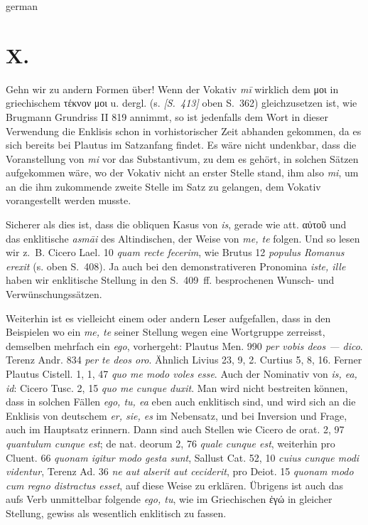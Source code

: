 \begin{otherlanguage*}{german}
\section*{X.}

Gehn wir zu andern Formen über! Wenn der Vokativ \emph{mī} wirklich dem μοι in griechischem τέκνον μοι u. dergl. (s. \hypertarget{p413}{\emph{[S.~413]}}\label{p413} oben S.~362) gleichzusetzen ist, wie Brugmann Grundriss II 819 annimmt, so ist jedenfalls dem Wort in dieser Verwendung die Enklisis schon in vorhistorischer Zeit abhanden gekommen, da es sich bereits bei Plautus im Satzanfang findet. Es wäre nicht undenkbar, dass die Voranstellung von \emph{mi} vor das Substantivum, zu dem es gehört, in solchen Sätzen aufgekommen wäre, wo der Vokativ nicht an erster Stelle stand, ihm also \emph{mi}, um an die ihm zukommende zweite Stelle im Satz zu gelangen, dem Vokativ vorangestellt werden musste.

Sicherer als dies ist, dass die obliquen Kasus von \emph{is}, gerade wie att. αὐτοῦ und das enklitische \emph{asmāi} des Altindischen, der Weise von \emph{me, te} folgen. Und so lesen wir z.~B. Cicero Lael. 10 \emph{quam  recte fecerim}, wie Brutus 12 \emph{populus  Romanus erexit} (s. oben S.~408). Ja auch bei den demonstrativeren Pronomina \emph{iste, ille} haben wir enklitische Stellung in den S.~409~ff. besprochenen Wunsch- und Verwünschungssätzen.

Weiterhin ist es vielleicht einem oder andern Leser aufgefallen, dass in den Beispielen wo ein \emph{me, te} seiner Stellung wegen eine Wortgruppe zerreisst, demselben mehrfach ein \emph{ego}, vorhergeht: Plautus Men. 990 \emph{per  vobis deos — dico}. Terenz Andr. 834 \emph{per  te deos oro}. Ähnlich Livius 23, 9, 2. Curtius 5, 8, 16. Ferner Plautus Cistell. 1, 1, 47 \emph{quo  me modo voles esse}. Auch der Nominativ von \emph{is, ea, id}: Cicero Tusc. 2, 15 \emph{quo  me cunque duxit}. Man wird nicht bestreiten können, dass in solchen Fällen \emph{ego, tu, ea} eben auch enklitisch sind, und wird sich an die Enklisis von deutschem \emph{er, sie, es} im Nebensatz, und bei Inversion und Frage, auch im Hauptsatz erinnern. Dann sind auch Stellen wie Cicero de orat. 2, 97 \emph{quantulum  cunque est}; de nat. deorum 2, 76 \emph{quale  cunque est}, weiterhin pro Cluent. 66 \emph{quonam igitur  modo gesta sunt}, Sallust Cat. 52, 10 \emph{cuius  cunque modi videntur}, Terenz Ad. 36 \emph{ne aut  alserit aut ceciderit}, pro Deiot. 15 \emph{quonam  modo cum regno distractus esset}, auf diese Weise zu erklären. Übrigens ist auch das aufs Verb unmittelbar folgende \emph{ego, tu}, wie im Griechischen ἐγώ in gleicher Stellung, gewiss als wesentlich enklitisch zu fassen.


\end{otherlanguage*}
